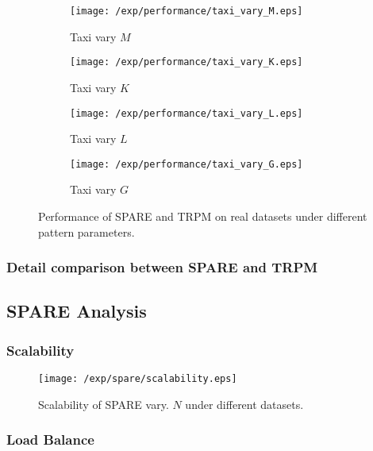 \begin{figure*}[t]
    \begin{subfigure}[b]{0.23\textwidth}
        \texttt{[image: /exp/performance/taxi\_vary\_M.eps]}
        \caption{Taxi vary $M$}
    \end{subfigure}
    \begin{subfigure}[b]{0.23\textwidth}
        \texttt{[image: /exp/performance/taxi\_vary\_K.eps]}
        \caption{Taxi vary $K$}
    \end{subfigure}
    \begin{subfigure}[b]{0.23\textwidth}
        \texttt{[image: /exp/performance/taxi\_vary\_L.eps]}
        \caption{Taxi vary $L$}
    \end{subfigure}
       \begin{subfigure}[b]{0.23\textwidth}
        \texttt{[image: /exp/performance/taxi\_vary\_G.eps]}
        \caption{Taxi vary $G$}
    \end{subfigure}       
\caption{Performance of SPARE and TRPM on real datasets under different pattern parameters.}
\label{exp:performance_vary}
\end{figure*}

\subsubsection{Detail comparison between SPARE and TRPM}



\subsection{SPARE Analysis}

\subsubsection{Scalability}
\begin{figure}[h]
\centering
   \texttt{[image: /exp/spare/scalability.eps]}
\caption{Scalability of SPARE vary. $N$ under different datasets.}
\label{exp:patterns_vary}
\end{figure}


\subsubsection{Load Balance}



